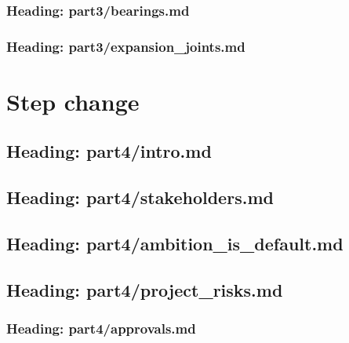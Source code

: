 \documentclass[letterpaper,10pt,english]{jupyterBook}
\begin{document}
\section{Heading: part3/bearings.md}
\label{\detokenize{part3/bearings:heading-part3-bearings-md}}\label{\detokenize{part3/bearings::doc}}
\sphinxstepscope


\section{Heading: part3/expansion\_joints.md}
\label{\detokenize{part3/expansion_joints:heading-part3-expansion-joints-md}}\label{\detokenize{part3/expansion_joints::doc}}
\sphinxstepscope


\part{Step change}

\sphinxstepscope


\chapter{Heading: part4/intro.md}
\label{\detokenize{part4/intro:heading-part4-intro-md}}\label{\detokenize{part4/intro::doc}}
\sphinxstepscope


\chapter{Heading: part4/stakeholders.md}
\label{\detokenize{part4/stakeholders:heading-part4-stakeholders-md}}\label{\detokenize{part4/stakeholders::doc}}
\sphinxstepscope


\chapter{Heading: part4/ambition\_is\_default.md}
\label{\detokenize{part4/ambition_is_default:heading-part4-ambition-is-default-md}}\label{\detokenize{part4/ambition_is_default::doc}}
\sphinxstepscope


\chapter{Heading: part4/project\_risks.md}
\label{\detokenize{part4/project_risks:heading-part4-project-risks-md}}\label{\detokenize{part4/project_risks::doc}}
\sphinxstepscope


\section{Heading: part4/approvals.md}
\label{\detokenize{part4/approvals:heading-part4-approvals-md}}\label{\detokenize{part4/approvals::doc}}
\sphinxstepscope
\end{document}
